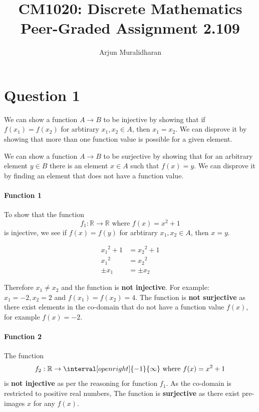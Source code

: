 
\title{CM1020: Discrete Mathematics \\ Peer-Graded Assignment 2.109}
\author{Arjun Muralidharan}

\maketitle
\pagebreak
\newpage
\renewcommand{\subsubsectionautorefname}{section\negthinspace}
\section*{Question 1}

We can show a function \( A \rightarrow B \)  to be injective by showing that if \( f(x_1) = f(x_2) \) for arbtirary \( x_1, x_2 \in A \), then \( x_1 = x_2 \). We can disprove it by showing that more than one function value is possible for a given element.

We can show a function \( A \rightarrow B \) to be surjective by showing that for an arbitrary element \( y \in B \) there is an element \( x \in A \) such that \( f(x) = y \). We can disprove it by finding an element that does not have a function value.

\paragraph{Function 1} To show that the function \[
f_1: \mathbb{R} \rightarrow \mathbb{R} \text{ where } f(x) = x^2 + 1  
\]
is injective, we see if \( f(x) = f(y) \) for arbtirary \( x_1, x_2 \in A \), then \( x = y \).

\begin{align}
  {x_1}^2 + 1 &= {x_2}^2 + 1 \\
  {x_1}^2 &= {x_2}^2 \\
  \pm x_1 &= \pm x_2
\end{align}

Therefore \( x_1 \neq x_2 \) and the function is \textbf{not injective}. For example: \( x_1 = -2, x_2 = 2 \) and \( f(x_1) = f(x_2) = 4 \). The function is \textbf{not surjective} as there exist elements in the co-domain that do not have a function value \( f(x) \), for example \( f(x) = -2 \).    

\paragraph{Function 2} The function \[
  f_2: \mathbb{R} \rightarrow \interval[open right]{-1}{\infty} \text{ where } f(x) = x^2 + 1
  \]
is \textbf{not injective} as per the reasoning for function \( f_1 \). 
As the co-domain is restricted to positive real numbers, The function is \textbf{surjective} as there exist pre-images \( x \) for any \( f(x) \).

